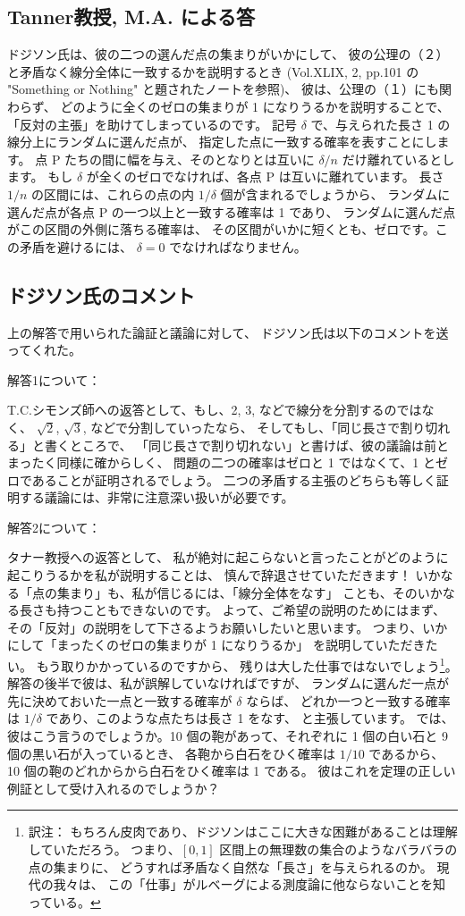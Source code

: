 \documentclass{article}
\begin{document}
\subsection*{Tanner教授, M.A. による答}

 ドジソン氏は、彼の二つの選んだ点の集まりがいかにして、
彼の公理の（２）と矛盾なく線分全体に一致するかを説明するとき
(Vol.XLIX, 2, pp.101 の "Something or Nothing" と題されたノートを参照)、
彼は、公理の（１）にも関わらず、
どのように全くのゼロの集まりが 1 になりうるかを説明することで、
「反対の主張」を助けてしまっているのです。
 記号 $\delta$ で、与えられた長さ 1 の線分上にランダムに選んだ点が、
指定した点に一致する確率を表すことにします。
点 P たちの間に幅を与え、そのとなりとは互いに $\delta / n$
だけ離れているとします。
もし $\delta$ が全くのゼロでなければ、各点 P は互いに離れています。
長さ $1/n$ の区間には、これらの点の内 $1/\delta$ 個が含まれるでしょうから、
ランダムに選んだ点が各点 P の一つ以上と一致する確率は 1 であり、
ランダムに選んだ点がこの区間の外側に落ちる確率は、
その区間がいかに短くとも、ゼロです。この矛盾を避けるには、
$\delta = 0$ でなければなりません。

\subsection*{ドジソン氏のコメント}

上の解答で用いられた論証と議論に対して、
ドジソン氏は以下のコメントを送ってくれた。

解答1について：

T.C.シモンズ師への返答として、もし、2, 3, などで線分を分割するのではなく、
$\sqrt{2}$, $\sqrt{3}$, などで分割していったなら、
そしてもし、「同じ長さで割り切れる」と書くところで、
「同じ長さで割り切れない」と書けば、彼の議論は前とまったく同様に確からしく、
問題の二つの確率はゼロと 1 ではなくて、1 とゼロであることが証明されるでしょう。
二つの矛盾する主張のどちらも等しく証明する議論には、非常に注意深い扱いが必要です。

解答2について：

タナー教授への返答として、
私が絶対に起こらないと言ったことがどのように起こりうるかを私が説明することは、
慎んで辞退させていただきます！
いかなる「点の集まり」も、私が信じるには、「線分全体をなす」
ことも、そのいかなる長さも持つこともできないのです。
よって、ご希望の説明のためにはまず、
その「反対」の説明をして下さるようお願いしたいと思います。
つまり、いかにして「まったくのゼロの集まりが 1 になりうるか」
を説明していただきたい。
もう取りかかっているのですから、
残りは大した仕事ではないでしょう\footnote{訳注：
もちろん皮肉であり、ドジソンはここに大きな困難があることは理解していただろう。
つまり、$[0, 1]$ 区間上の無理数の集合のようなバラバラの点の集まりに、
どうすれば矛盾なく自然な「長さ」を与えられるのか。
現代の我々は、
この「仕事」がルベーグによる測度論に他ならないことを知っている。}。
解答の後半で彼は、私が誤解していなければですが、
ランダムに選んだ一点が先に決めておいた一点と一致する確率が $\delta$ ならば、
どれか一つと一致する確率は $1/\delta$ であり、このような点たちは長さ 1 をなす、
と主張しています。
では、彼はこう言うのでしょうか。10 個の鞄があって、それぞれに
1 個の白い石と 9 個の黒い石が入っているとき、
各鞄から白石をひく確率は $1/10$ であるから、
10 個の鞄のどれからから白石をひく確率は 1 である。
彼はこれを定理の正しい例証として受け入れるのでしょうか？
\end{document}
